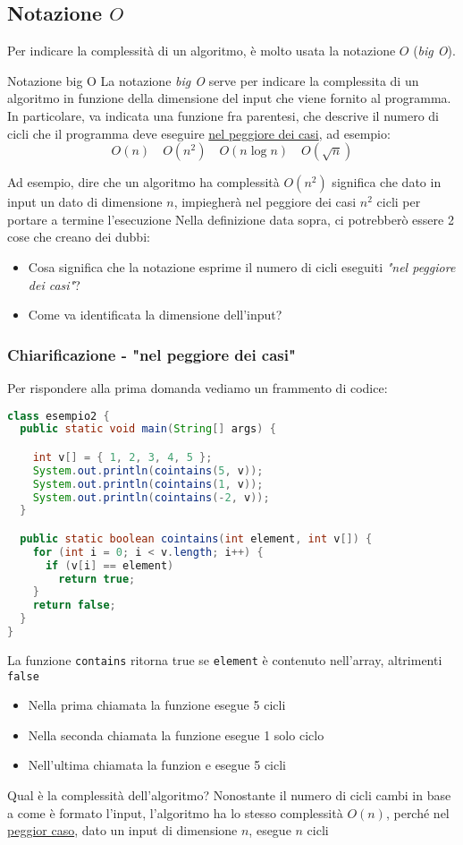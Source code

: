 \subsection{Notazione $ O $}
Per indicare la complessità di un algoritmo, è molto usata la notazione $ O $ (\textit{big O}).
\begin{definizione}{Notazione big O}
	La notazione \textit{big O} serve per indicare la complessita di un algoritmo in funzione della dimensione del input che viene fornito al programma. In particolare, va indicata una funzione fra parentesi, che descrive il numero di cicli che il programma deve eseguire \underline{nel peggiore dei casi}, ad esempio:
	\[
		O\left(n\right) \quad O\left(n^2 \right) \quad O\left(n \log n\right) \quad O \left(\sqrt{n}\right)
	\]
\end{definizione}

Ad esempio, dire che un algoritmo ha complessità $ O\left(n^2 \right) $ significa che dato in input un dato di dimensione $ n $, impiegherà nel peggiore dei casi $ n^2  $ cicli per portare a termine l'esecuzione
\vskip3mm
Nella definizione data sopra, ci potrebberò essere 2 cose che creano dei dubbi:
\begin{itemize}
	\item Cosa significa che la notazione esprime il numero di cicli eseguiti \textit{"nel peggiore dei casi"}?
	\item Come va identificata la dimensione dell'input?
\end{itemize}

\subsubsection{Chiarificazione - "nel peggiore dei casi"}
Per rispondere alla prima domanda vediamo un frammento di codice:
\begin{lstlisting}[language = java, frame = none]
class esempio2 {
  public static void main(String[] args) {

    int v[] = { 1, 2, 3, 4, 5 };
    System.out.println(cointains(5, v));
    System.out.println(cointains(1, v));
    System.out.println(cointains(-2, v)); 
  }

  public static boolean cointains(int element, int v[]) {
    for (int i = 0; i < v.length; i++) {
      if (v[i] == element)
        return true;
    }
    return false;
  }
}
\end{lstlisting}

La funzione \verb|contains| ritorna true se \verb|element| è contenuto nell'array, altrimenti \verb|false|
\begin{itemize}
	\item Nella prima chiamata la funzione esegue 5 cicli
	\item Nella seconda chiamata la funzione esegue 1 solo ciclo
	\item Nell'ultima chiamata la funzion e esegue 5 cicli
\end{itemize}
Qual è la complessità dell'algoritmo?
\vskip3mm
Nonostante il numero di cicli cambi in base a come è formato l'input, l'algoritmo ha lo stesso complessità $ O\left(n\right) $, perché nel \underline{peggior caso}, dato un input di dimensione $ n $, esegue $ n $ cicli
